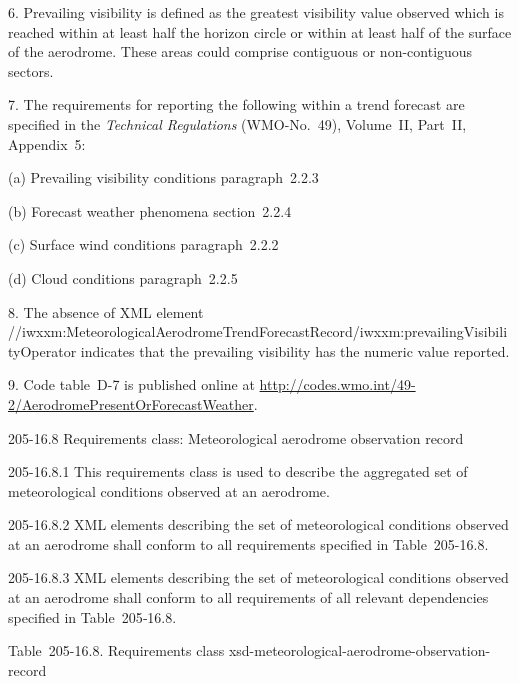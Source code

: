 6. Prevailing visibility is defined as the greatest visibility value observed which is reached within at least half the horizon circle or within at least half of the surface of the aerodrome. These areas could comprise contiguous or non-contiguous sectors.

7. The requirements for reporting the following within a trend forecast are specified in the \emph{Technical Regulations} (WMO-No.~49), Volume~II, Part~II, Appendix~5:

(a) Prevailing visibility conditions paragraph~2.2.3

(b) Forecast weather phenomena section~2.2.4

(c) Surface wind conditions paragraph~2.2.2

(d) Cloud conditions paragraph~2.2.5

8. The absence of XML element //iwxxm:MeteorologicalAerodromeTrendForecastRecord/iwxxm:prevailingVisibilityOperator indicates that the prevailing visibility has the numeric value reported.

9. Code table~D-7 is published online at \url{http://codes.wmo.int/49-2/AerodromePresentOrForecastWeather}.

205-16.8 Requirements class: Meteorological aerodrome observation record

205-16.8.1 This requirements class is used to describe the aggregated set of meteorological conditions observed at an aerodrome.

205-16.8.2 XML elements describing the set of meteorological conditions observed at an aerodrome shall conform to all requirements specified in Table~205-16.8.

205-16.8.3 XML elements describing the set of meteorological conditions observed at an aerodrome shall conform to all requirements of all relevant dependencies specified in Table~205‑16.8.

Table~205-16.8. Requirements class xsd-meteorological-aerodrome-observation-record

